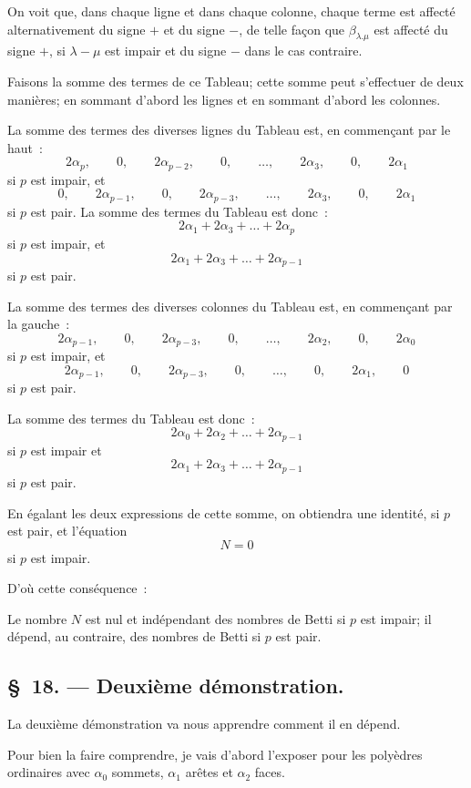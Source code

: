 \documentclass{article}
\begin{document}
On voit que, dans chaque ligne et dans chaque colonne, chaque terme est affecté alternativement du signe $+$ et du signe $-$, de telle façon que $\beta_{\lambda.\mu}$ est affecté du signe $+$, si $\lambda - \mu$ est impair et du signe $-$ dans le cas contraire.

Faisons la somme des termes de ce Tableau; cette somme peut s'effectuer de deux manières; en sommant d'abord les lignes et en sommant d'abord les colonnes.

La somme des termes des diverses lignes du Tableau est, en commençant par le haut~:
\[ 2\alpha_{p}, \qquad 0, \qquad 2\alpha_{p-2}, \qquad 0, \qquad \ldots, \qquad 2\alpha_{3}, \qquad 0, \qquad 2\alpha_{1} \]
si $p$ est impair, et
\[ 0, \qquad 2\alpha_{p-1}, \qquad 0, \qquad 2\alpha_{p-3}, \qquad \ldots, \qquad 2\alpha_{3}, \qquad 0, \qquad 2\alpha_{1} \]
si $p$ est pair. La somme des termes du Tableau est donc~:
\[ 2\alpha_{1} + 2\alpha_{3} + \ldots + 2\alpha_{p} \]
si $p$ est impair, et
\[ 2\alpha_{1} + 2\alpha_{3} + \ldots + 2\alpha_{p-1} \]
si $p$ est pair.

La somme des termes des diverses colonnes du Tableau est, en commençant par la gauche~:
\[ 2\alpha_{p-1}, \qquad 0, \qquad 2\alpha_{p-3}, \qquad 0, \qquad \ldots, \qquad 2\alpha_{2}, \qquad 0, \qquad 2\alpha_{0} \]
si $p$ est impair, et
\[ 2\alpha_{p-1}, \qquad 0, \qquad 2\alpha_{p-3}, \qquad 0, \qquad \ldots, \qquad 0, \qquad 2\alpha_{1}, \qquad 0 \]
si $p$ est pair.

La somme des termes du Tableau est donc~:
\[ 2\alpha_{0} + 2\alpha_{2} + \ldots + 2\alpha_{p-1} \]
si $p$ est impair et
\[ 2\alpha_{1} + 2\alpha_{3} + \ldots + 2\alpha_{p-1} \]
si $p$ est pair.

En égalant les deux expressions de cette somme, on obtiendra une identité, si $p$ est pair, et l'équation
\[ N = 0 \]
si $p$ est impair.

D'où cette conséquence~:

Le nombre $N$ est nul et indépendant des nombres de Betti si $p$ est impair; il dépend, au contraire, des nombres de Betti si $p$ est pair.

\subsection*{\S~18. --- Deuxième démonstration.}

La deuxième démonstration va nous apprendre comment il en dépend.

Pour bien la faire comprendre, je vais d'abord l'exposer pour les polyèdres ordinaires avec $\alpha_{0}$ sommets, $\alpha_{1}$ arêtes et $\alpha_{2}$ faces.
\end{document}
